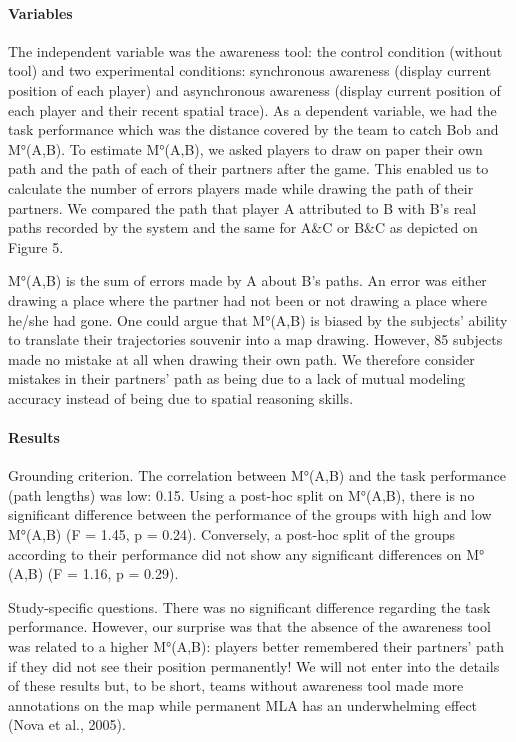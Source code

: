 \documentclass[twocolumn]{article}
\begin{document}
\paragraph{Variables}

The independent variable was the awareness tool: the control condition (without
tool) and two experimental conditions: synchronous awareness (display current
position of each player) and asynchronous awareness (display current position of
each player and their recent spatial trace).  As a dependent variable, we had
the task performance which was the distance covered by the team to catch Bob and
M°(A,B). To estimate M°(A,B), we asked players to draw on paper their own path
and the path of each of their partners after the game. This enabled us to
calculate the number of errors players made while drawing the path of their
partners. We compared the path that player A attributed to B with B's real paths
recorded by the system and the same for A\&C or B\&C as depicted on Figure 5. 
 

M°(A,B) is the sum of errors made by A about B’s paths. An error was either
drawing a place where the partner had not been or not drawing a place where
he/she had gone. One could argue that M°(A,B) is biased by the subjects' ability
to translate their trajectories souvenir into a map drawing. However, 85%
subjects made no mistake at all when drawing their own path. We therefore
consider mistakes in their partners' path as being due to a lack of mutual
modeling accuracy instead of being due to spatial reasoning skills.

\paragraph{Results}

Grounding criterion. The correlation between M°(A,B) and the task performance
(path lengths) was low: 0.15. Using a post-hoc split on M°(A,B), there is no
significant difference between the performance of the groups with high and low
M°(A,B)  (F = 1.45, p = 0.24). Conversely, a post-hoc split of the groups
according to their performance did not show any significant differences on
M°(A,B) (F = 1.16, p = 0.29).

Study-specific questions. There was no significant difference regarding the task
performance. However, our surprise was that the absence of the awareness tool
was related to a higher M°(A,B): players better remembered their partners’ path
if they did not see their position permanently! We will not enter into the
details of these results but, to be short, teams without awareness tool made
more annotations on the map while permanent MLA has an underwhelming effect
(Nova et al., 2005).
\end{document}
